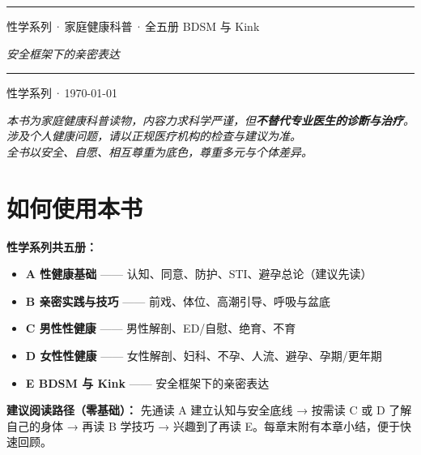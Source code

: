 \documentclass[12pt,UTF8,openany]{ctexbook}
\begin{document}
\begin{titlepage}
\centering
\vspace*{1.5cm}
\vspace{0.6cm}
\noindent\rule{\textwidth}{0.4pt}
\vspace{0.5cm}
\myhei{} 性学系列\,·\,家庭健康科普\,·\,全五册
\vspace{2.5cm}
\myhei{} BDSM 与 Kink\par
\vspace{1.2cm}
\itshape{} 安全框架下的亲密表达\par
\vspace{5.2cm}
\noindent\rule{\textwidth}{0.4pt}
\vspace{0.5cm}
 性学系列\,·\,\today
\end{titlepage}

\begin{center}\itshape
本书为家庭健康科普读物，内容力求科学严谨，但\textbf{不替代专业医生的诊断与治疗}。\\
涉及个人健康问题，请以正规医疗机构的检查与建议为准。\\
全书以安全、自愿、相互尊重为底色，尊重多元与个体差异。\par\end{center}
\clearpage

\chapter*{如何使用本书}
\noindent\textbf{性学系列共五册：}
\begin{itemize}[leftmargin=2em]
\item \textbf{A 性健康基础} —— 认知、同意、防护、STI、避孕总论（建议先读）
\item \textbf{B 亲密实践与技巧} —— 前戏、体位、高潮引导、呼吸与盆底
\item \textbf{C 男性性健康} —— 男性解剖、ED/自慰、绝育、不育
\item \textbf{D 女性性健康} —— 女性解剖、妇科、不孕、人流、避孕、孕期/更年期
\item \textbf{E BDSM 与 Kink} —— 安全框架下的亲密表达
\end{itemize}
\vspace{0.6em}
\noindent\textbf{建议阅读路径（零基础）：} 先通读 A 建立认知与安全底线 → 按需读 C 或 D 了解自己的身体 → 再读 B 学技巧 → 兴趣到了再读 E。每章末附有本章小结，便于快速回顾。
\clearpage
\end{document}
